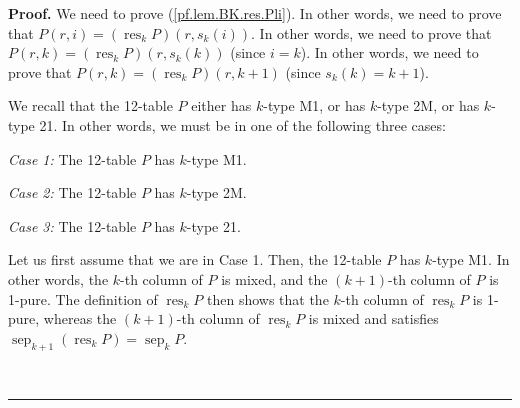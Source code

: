 \documentclass[numbers=enddot,12pt,final,onecolumn,notitlepage]{scrartcl}%
\theoremstyle{definition}
\newenvironment{proof}[1][Proof]{\noindent\textbf{#1.} }{\ \rule{0.5em}{0.5em}}
\begin{document}
\begin{proof}
We need to prove (\ref{pf.lem.BK.res.Pli}). In other words, we need to prove
that $P\left(  r,i\right)  =\left(  \operatorname*{res}\nolimits_{k}P\right)
\left(  r,s_{k}\left(  i\right)  \right)  $. In other words, we need to prove
that $P\left(  r,k\right)  =\left(  \operatorname*{res}\nolimits_{k}P\right)
\left(  r,s_{k}\left(  k\right)  \right)  $ (since $i=k$). In other words, we
need to prove that $P\left(  r,k\right)  =\left(  \operatorname*{res}%
\nolimits_{k}P\right)  \left(  r,k+1\right)  $ (since $s_{k}\left(  k\right)
=k+1$).

We recall that the 12-table $P$ either has $k$-type M1, or has $k$-type 2M, or
has $k$-type 21. In other words, we must be in one of the following three cases:

\textit{Case 1:} The 12-table $P$ has $k$-type M1.

\textit{Case 2:} The 12-table $P$ has $k$-type 2M.

\textit{Case 3:} The 12-table $P$ has $k$-type 21.

Let us first assume that we are in Case 1. Then, the 12-table $P$ has $k$-type
M1. In other words, the $k$-th column of $P$ is mixed, and the $\left(
k+1\right)  $-th column of $P$ is 1-pure. The definition of
$\operatorname*{res}\nolimits_{k}P$ then shows that the $k$-th column of
$\operatorname*{res}_{k}P$ is 1-pure, whereas the $\left(  k+1\right)  $-th
column of $\operatorname*{res}\nolimits_{k}P$ is mixed and satisfies
$\operatorname*{sep}\nolimits_{k+1}\left(  \operatorname*{res}\nolimits_{k}%
P\right)  =\operatorname*{sep}\nolimits_{k}P$.


\end{proof}
\end{document}
